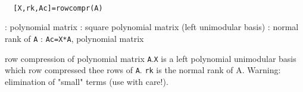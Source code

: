 
\begin{mandesc}
   \\ %
\end{mandesc}
\begin{calling_sequence}
\begin{verbatim}
  [X,rk,Ac]=rowcompr(A)  
\end{verbatim}
\end{calling_sequence}
\begin{parameters}
  \begin{varlist}
    : polynomial matrix
    : square polynomial matrix (left unimodular basis)
    : normal rank of \verb!A!
    : \verb!Ac=X*A!, polynomial matrix
  \end{varlist}
\end{parameters}
\begin{mandescription}
  row compression of polynomial matrix \verb!A!.\verb!X! is a left polynomial unimodular basis which row compressed
  thee rows of \verb!A!. \verb!rk! is the normal rank of A.
  Warning: elimination of "small" terms (use with care!).
\end{mandescription}
\begin{manseealso}
\end{manseealso}
